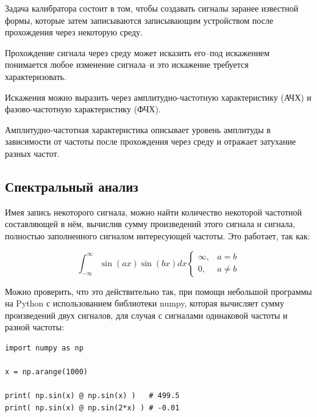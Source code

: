 \documentclass[rusmathsym, eqnumwithinsec, amspack, hyperref]{bomgost}
\begin{document}
Задача калибратора состоит в том, чтобы создавать сигналы заранее известной формы, которые затем записываются записывающим устройством после прохождения через некоторую среду.

Прохождение сигнала через среду может исказить его–под искажением понимается любое изменение сигнала–и это искажение требуется характеризовать.

Искажения можно выразить через амплитудно-частотную характеристику (АЧХ) и фазово-частотную характеристику (ФЧХ).

Амплитудно-частотная характеристика описывает уровень амплитуды в зависимости от частоты после прохождения через среду и отражает затухание разных частот.

\subsection{Спектральный анализ}

Имея запись некоторого сигнала, можно найти количество некоторой частотной составляющей в нём, вычислив сумму произведений этого сигнала и сигнала, полностью заполненного сигналом интересующей частоты. Это работает, так как:

\begin{equation}
	\int_{-\infty}^{\infty}{\sin(ax)\sin(bx)}{dx}
	\begin{cases}
		\infty,& a = b\\
		0,     & a \neq b
	\end{cases}
\end{equation}

Можно проверить, что это действительно так, при помощи небольшой программы на Python с использованием библиотеки numpy, которая вычисляет сумму произведений двух сигналов, для случая с сигналами одинаковой частоты и разной частоты:

\lstset{
	language=python,
	basicstyle=\ttfamily,
    numbers=left,
    stepnumber=1,
    showstringspaces=false,
    tabsize=4,
    breaklines=true,
    breakatwhitespace=false,
}
\begin{lstlisting}
import numpy as np

x = np.arange(1000)

print( np.sin(x) @ np.sin(x) )   # 499.5
print( np.sin(x) @ np.sin(2*x) ) # -0.01
\end{lstlisting}
\end{document}
